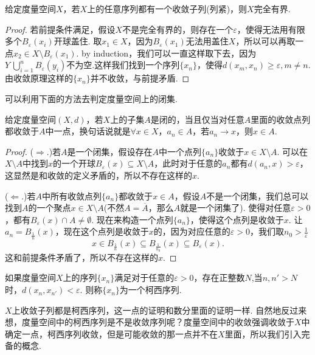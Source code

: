 \begin{proposition}
给定度量空间$X$，若$X$上的任意序列都有一个收敛子列(列紧)，则$X$完全有界.
\end{proposition}

\begin{proof}
若前提条件满足，假设$X$不是完全有界的，则存在一个$\varepsilon$，使得无法用有限多个$B_\varepsilon(x_i)$开球盖住. 取$x_1 \in X$，因为$B_\varepsilon(x_1)$无法用盖住$X$，所以可以再取一点$x_2 \in X \setminus B_\varepsilon(x_1)$. by induction，我们可以一直这样取下去，因为$Y \ \bigcup\limits_{i=1}^{n} B_\varepsilon(y_i)$不为空.这样我们找到一个序列$\{x_n\}$，使得$d(x_m,x_n) \geq \varepsilon,m \neq n$.由收敛原理这样的$\{x_n\}$并不收敛，与前提矛盾.
\end{proof}

可以利用下面的方法去判定度量空间上的闭集.

\begin{proposition}
给定度量空间$(X,d)$，若$X$上的子集$A$是闭的，当且仅当对任意$A$里面的收敛点列都收敛于$A$中一点，换句话说就是$\forall x \in X，a_n \in A$，若$a_n \rightarrow x$，则$x \in A$.
\end{proposition}

\begin{proof}
($\Rightarrow.$)若$A$是一个闭集，假设存在$A$中一个点列$\{a_n\}$收敛于$x \in X \setminus A$. 可以在$X \setminus A$中找到$x$的一个开球$B_\varepsilon(x) \subseteq X \setminus A$，此时对于任意的$a_n$都有$d(a_n,x) > \varepsilon$，这显然是和收敛的定义矛盾的，所以不存在这样的$x$.

($\Leftarrow.$)若$A$中所有收敛点列$\{a_n\}$都收敛于$x \in A$，假设$A$不是一个闭集，我们总可以找到$A$的一个聚点$x \in X \setminus A$(不然$A = \overline{A}$，那么$A$就是一个闭集了). 使得对任意$\varepsilon > 0$，都有$B_\varepsilon(x) \cap A \neq \emptyset$. 现在来构造一个点列$\{a_n\}$，使得这个点列是收敛于$x$. 让$a_n = B_{\frac{1}{n}}(x)$，现在这个点列是收敛于$x$的，因为对应任意的$\varepsilon > 0$，我们取$n_0 > \frac{1}{\varepsilon}$ \[x \in B_{\frac{1}{n}}(x) \subseteq B_{\frac{1}{n_0}}(x) \subseteq B_\varepsilon(x).\]这和前提条件矛盾了，所以不存在这样的$x$.
\end{proof}


\begin{definition}[度量空间上的柯西序列]
如果度量空间$X$上的序列$\{x_n\}$满足对于任意的$\varepsilon > 0$，存在正整数$N$,当$n,n'>N$时，$d(x_n,x_{n'}) < \varepsilon$. 则称$\{x_n\}$为一个柯西序列.
\end{definition}

$X$上收敛子列都是柯西序列，这一点的证明和数分里面的证明一样. 自然地反过来想，度量空间中的柯西序列是不是收敛序列呢？度量空间中的收敛强调收敛于$X$中确定一点，柯西序列收敛，但是可能收敛的那一点并不在$X$里面，所以我们引入完备的概念.

